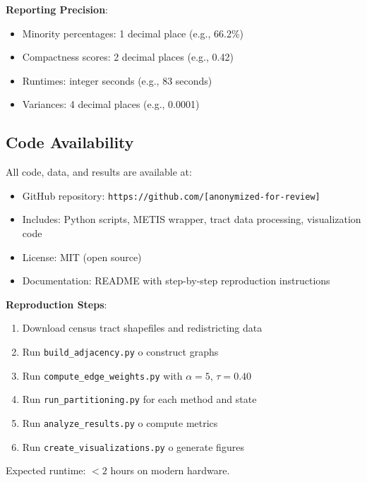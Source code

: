 \textbf{Reporting Precision}:
\begin{itemize}
    \item Minority percentages: 1 decimal place (e.g., 66.2\%)
    \item Compactness scores: 2 decimal places (e.g., 0.42)
    \item Runtimes: integer seconds (e.g., 83 seconds)
    \item Variances: 4 decimal places (e.g., 0.0001)
\end{itemize}

\subsection{Code Availability}

All code, data, and results are available at:
\begin{itemize}
    \item GitHub repository: \texttt{https://github.com/[anonymized-for-review]}
    \item Includes: Python scripts, METIS wrapper, tract data processing, visualization code
    \item License: MIT (open source)
    \item Documentation: README with step-by-step reproduction instructions
\end{itemize}

\textbf{Reproduction Steps}:
\begin{enumerate}
    \item Download census tract shapefiles and redistricting data
    \item Run \texttt{build\_adjacency.py} 	o construct graphs
    \item Run \texttt{compute\_edge\_weights.py} with $\alpha=5$, $\tau=0.40$
    \item Run \texttt{run\_partitioning.py} for each method and state
    \item Run \texttt{analyze\_results.py} 	o compute metrics
    \item Run \texttt{create\_visualizations.py} 	o generate figures
\end{enumerate}

Expected runtime: $< 2$ hours on modern hardware.
